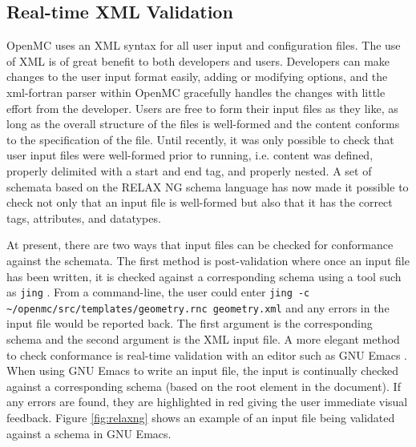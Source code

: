 \documentclass{ansconf}
\begin{document}
\subsection{Real-time XML Validation}

OpenMC uses an XML syntax for all user input and configuration files. The use of
XML is of great benefit to both developers and users. Developers can make
changes to the user input format easily, adding or modifying options, and the
xml-fortran parser within OpenMC gracefully handles the changes with little
effort from the developer. Users are free to form their input files as they
like, as long as the overall structure of the files is well-formed and the
content conforms to the specification of the file.  Until recently, it was only
possible to check that user input files were well-formed prior to running,
i.e. content was defined, properly delimited with a start and end tag, and
properly nested. A set of schemata based on the RELAX NG schema language
\cite{relaxng-2008} has now made it possible to check not only that an input
file is well-formed but also that it has the correct tags, attributes, and
datatypes.

At present, there are two ways that input files can be checked for conformance
against the schemata. The first method is post-validation where once an input
file has been written, it is checked against a corresponding schema using a tool
such as \texttt{jing} \cite{jing-2012}. From a command-line, the user could
enter \texttt{jing -c \textasciitilde/openmc/src/templates/geometry.rnc
  geometry.xml} and any errors in the input file would be reported back. The
first argument is the corresponding schema and the second argument is the XML
input file. A more elegant method to check conformance is real-time validation
with an editor such as GNU Emacs \cite{emacs-2012}. When using GNU Emacs to
write an input file, the input is continually checked against a corresponding
schema (based on the root element in the document). If any errors are found,
they are highlighted in red giving the user immediate visual feedback. Figure
\ref{fig:relaxng} shows an example of an input file being validated against a
schema in GNU Emacs.
\end{document}
